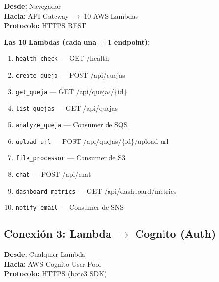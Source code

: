 \documentclass[11pt,a4paper]{article}
\begin{document}
\begin{tcolorbox}[colback=orange!5, colframe=awsorange, title=\textbf{Desde $\rightarrow$ Hasta}]
\textbf{Desde:} Navegador \\
\textbf{Hacia:} API Gateway $\rightarrow$ 10 AWS Lambdas \\
\textbf{Protocolo:} HTTPS REST
\end{tcolorbox}

\begin{center}
\end{center}

\textbf{Las 10 Lambdas (cada una = 1 endpoint):}
\begin{enumerate}[leftmargin=*]
  \item \texttt{health\_check} --- GET /health
  \item \texttt{create\_queja} --- POST /api/quejas
  \item \texttt{get\_queja} --- GET /api/quejas/\{id\}
  \item \texttt{list\_quejas} --- GET /api/quejas
  \item \texttt{analyze\_queja} --- Consumer de SQS
  \item \texttt{upload\_url} --- POST /api/quejas/\{id\}/upload-url
  \item \texttt{file\_processor} --- Consumer de S3
  \item \texttt{chat} --- POST /api/chat
  \item \texttt{dashboard\_metrics} --- GET /api/dashboard/metrics
  \item \texttt{notify\_email} --- Consumer de SNS
\end{enumerate}

\subsection{Conexi\'on 3: Lambda $\rightarrow$ Cognito (Auth)}

\begin{tcolorbox}[colback=purple!5, colframe=awspurple, title=\textbf{Desde $\rightarrow$ Hasta}]
\textbf{Desde:} Cualquier Lambda \\
\textbf{Hacia:} AWS Cognito User Pool \\
\textbf{Protocolo:} HTTPS (boto3 SDK)
\end{tcolorbox}
\end{document}
